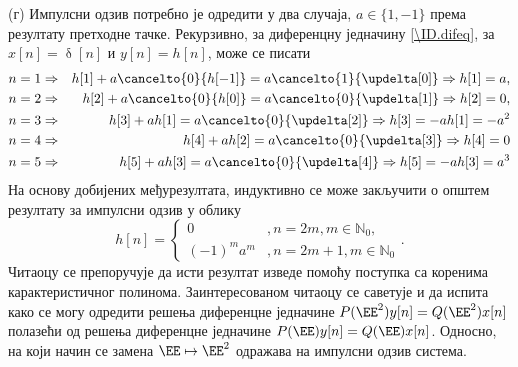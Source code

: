 (г) Импулсни одзив потребно је одредити у два случаја, $a \in \{1,-1\}$ према резултату претходне тачке. 
Рекурзивно, за диференцну једначину \eqref{\ID.difeq}, за $x[n] = \updelta[n]$ и $y[n] = h[n]$, може се писати 
\begin{eqnarray}
    n = 1 &\Rightarrow& h[1] + a \cancelto{0}{h[-1]} = a \cancelto{1}{\updelta[0]} 
    \Rightarrow h[1] = a, \\
    n = 2 &\Rightarrow& h[2] + a \cancelto{0}{h[0]} = a \cancelto{0}{\updelta[1]} 
    \Rightarrow h[2] = 0, \\
    n = 3 &\Rightarrow& h[3] + a h[1] = a \cancelto{0}{\updelta[2]} 
    \Rightarrow h[3] = - a h[1] = - a^2 \\
    n = 4 &\Rightarrow& h[4] + a h[2] = a \cancelto{0}{\updelta[3]} 
    \Rightarrow h[4] = 0 \\
    n = 5 &\Rightarrow& h[5] + a h[3] = a \cancelto{0}{\updelta[4]} 
    \Rightarrow h[5] = - a h[3] = a^3 \\
\end{eqnarray}
На основу добијених међурезултата, индуктивно се може закључити о општем резултату за импулсни одзив у облику 
\begin{equation}
    h[n] = 
    \begin{cases}
        0 &, n = 2m, m \in \mathbb N_0, \\
        (-1)^m a^{m} &, n = 2m + 1, m \in \mathbb N_0 
    \end{cases}.
\end{equation}
Читаоцу се препоручује да исти резултат изведе помоћу поступка са коренима карактеристичног полинома.  
Заинтересованом читаоцу се саветује и да испита како се могу одредити 
решења диференцне једначине $P(\EE^2) y[n] = Q(\EE^2) x[n]$ полазећи од решења диференцне  
једначине $P(\EE) y[n] = Q(\EE) x[n]$. Односно, на који начин се замена $\EE \mapsto \EE^2$ 
одражава на импулсни одзив система. 
